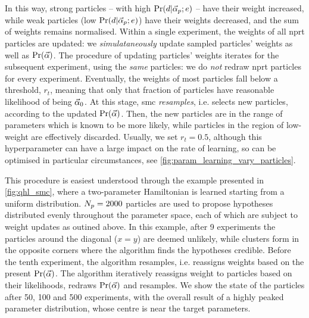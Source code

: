In this way, strong \glspl{particle} -- with high $\Pr(d | \vec{\alpha}_p; e)$ -- have their weight increased, 
    while weak \glspl{particle} (low $\Pr(d | \vec{\alpha}_p; e)$) have their weights decreased, 
    and the sum of weights remains normalised. 
Within a single experiment, the weights of all \gls{nprt} \glspl{particle} are updated:
    we \emph{simulataneously} update sampled \glspl{particle}' weights as well as $\Pr(\vec{\alpha})$. 
The procedure of updating \glspl{particle}' weights iterates for the subsequent experiment, using the \emph{same} \glspl{particle}: 
    we do \emph{not} redraw \gls{nprt} \glspl{particle} for every experiment.
Eventually, the weights of most \glspl{particle} fall below a threshold, $r_t$, 
    meaning that only that fraction of \glspl{particle} have reasonable \gls{likelihood} of being $\vec{\alpha}_0$.
At this stage, \gls{smc} \emph{resamples}, i.e. selects new \glspl{particle}, according to the updated $\Pr(\vec{\alpha})$\footnotemark.
Then, the new \glspl{particle} are in the range of parameters which is known to be more likely, 
    while \glspl{particle} in the region of low-weight are effectively discarded. 
Usually, we set $r_t=0.5$, although this \gls{hyperparameter} can have a large impact 
    on the rate of learning, so can be optimised in particular circumstances, 
    see \cref{fig:param_learning_vary_particles}.
\par 
This procedure is easiest understood through the example presented in \cref{fig:qhl_smc}, 
    where a two-parameter Hamiltonian is learned starting from a uniform distribution. 
$N_p=2000$ \glspl{particle} are used to propose hypotheses distributed evenly throughout the parameter space, 
    each of which are subject to weight updates as outined above. 
In this example, after 9 experiments the \glspl{particle} around the diagonal ($x=y$) are deemed unlikely, 
    while clusters form in the opposite corners where the algorithm finds the hypotheses credible. 
Before the tenth experiment, the algorithm resamples, i.e. reassigns weights based on the present $\Pr(\vec{\alpha})$. 
The algorithm iteratively reassigns weight to \glspl{particle} based on their likelihoods, redraws $\Pr(\vec{\alpha})$ and resamples. 
We show the state of the \glspl{particle} after 50, 100 and 500 experiments,
    with the overall result of a highly peaked parameter distribution, 
    whose centre is near the target parameters. 


